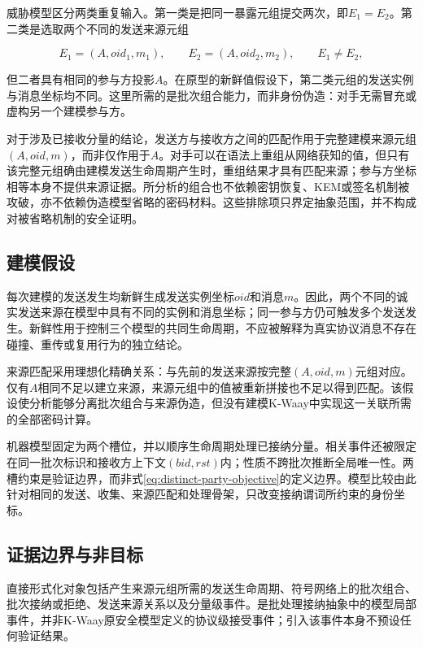 威胁模型区分两类重复输入。第一类是把同一暴露元组提交两次，即$E_1=E_2$。第二类是选取两个不同的发送来源元组

\begin{equation}
  E_1=(A,\mathit{oid}_1,m_1),
  \qquad
  E_2=(A,\mathit{oid}_2,m_2),
  \qquad
  E_1\neq E_2,
  \label{eq:repeated-party-capability}
\end{equation}

但二者具有相同的参与方投影$A$。在原型的新鲜值假设下，第二类元组的发送实例与消息坐标均不同。这里所需的是批次组合能力，而非身份伪造：对手无需冒充或虚构另一个建模参与方。

对于涉及已接收分量的结论，发送方与接收方之间的匹配作用于完整建模来源元组$(A,\mathit{oid},m)$，而非仅作用于$A$。对手可以在语法上重组从网络获知的值，但只有该完整元组确由建模发送生命周期产生时，重组结果才具有匹配来源；参与方坐标相等本身不提供来源证据。所分析的组合也不依赖密钥恢复、KEM或签名机制被攻破，亦不依赖伪造模型省略的密码材料。这些排除项只界定抽象范围，并不构成对被省略机制的安全证明。

\subsection{建模假设}

每次建模的发送发生均新鲜生成发送实例坐标$\mathit{oid}$和消息$m$。因此，两个不同的诚实发送来源在模型中具有不同的实例和消息坐标；同一参与方仍可触发多个发送发生。新鲜性用于控制三个模型的共同生命周期，不应被解释为真实协议消息不存在碰撞、重传或复用行为的独立结论。

来源匹配采用理想化精确关系：\receiveraccept 与先前的发送来源按完整$(A,\mathit{oid},m)$元组对应。仅有$A$相同不足以建立来源，来源元组中的值被重新拼接也不足以得到匹配。该假设使分析能够分离批次组合与来源伪造，但没有建模K-Waay中实现这一关联所需的全部密码计算。

机器模型固定为两个槽位，并以顺序生命周期处理已接纳分量。相关事件还被限定在同一批次标识和接收方上下文$(\mathit{bid},\mathit{rst})$内；性质不跨批次推断全局唯一性。两槽约束是验证边界，而非式\eqref{eq:distinct-party-objective}的定义边界。模型比较由此针对相同的发送、收集、来源匹配和处理骨架，只改变接纳谓词所约束的身份坐标。

\subsection{证据边界与非目标}

直接形式化对象包括产生来源元组所需的发送生命周期、符号网络上的批次组合、批次接纳或拒绝、发送来源关系以及分量级\receiveraccept 事件。\receiveraccept 是批处理接纳抽象中的模型局部事件，并非K-Waay原安全模型定义的协议级接受事件；引入该事件本身不预设任何验证结果。

